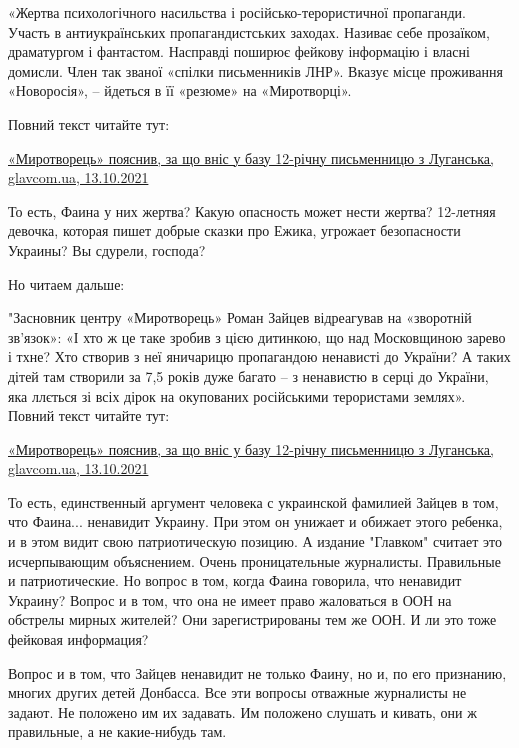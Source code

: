 «Жертва психологічного насильства і російсько-терористичної пропаганди. Участь
в антиукраїнських пропагандистських заходах. Називає себе прозаїком,
драматургом і фантастом. Насправді поширює фейкову інформацію і власні домисли.
Член так званої «спілки письменників ЛНР». Вказує місце проживання «Новоросія»,
– йдеться в її «резюме» на «Миротворці». 

Повний текст читайте тут:

\href{https://glavcom.ua/country/criminal/mirotvorec-poyasniv-za-shcho-vnis-u-bazu-12-richnu-pismennicyu-z-luganska-790774.html}{%
«Миротворець» пояснив, за що вніс у базу 12-річну письменницю з Луганська, glavcom.ua, 13.10.2021%
}

То есть, Фаина у них жертва? Какую опасность может нести жертва? 12-летняя
девочка, которая пишет добрые сказки про Ежика, угрожает безопасности Украины?
Вы сдурели, господа?

Но читаем дальше: 

"Засновник центру «Миротворець» Роман Зайцев відреагував на «зворотній
зв’язок»: «І хто ж це таке зробив з цією дитинкою, що над Московщиною зарево і
тхне? Хто створив з неї яничарицю пропагандою ненависті до України? А таких
дітей там створили за 7,5 років дуже багато – з ненавистю в серці до України,
яка ллється зі всіх дірок на окупованих російськими терористами землях». Повний
текст читайте тут: 

\href{https://glavcom.ua/country/criminal/mirotvorec-poyasniv-za-shcho-vnis-u-bazu-12-richnu-pismennicyu-z-luganska-790774.html}{%
«Миротворець» пояснив, за що вніс у базу 12-річну письменницю з Луганська, glavcom.ua, 13.10.2021%
}

То есть, единственный аргумент человека с украинской фамилией Зайцев в том, что
Фаина... ненавидит Украину. При этом он унижает и обижает этого ребенка, и в
этом видит свою патриотическую позицию. А издание "Главком" считает это
исчерпывающим объяснением. Очень проницательные журналисты. Правильные и
патриотические. Но вопрос в том, когда Фаина говорила, что ненавидит Украину?
Вопрос и в том, что она не имеет право жаловаться в ООН на обстрелы мирных
жителей? Они зарегистрированы тем же ООН. И ли это тоже фейковая информация?

Вопрос и в том, что Зайцев ненавидит не только Фаину, но и, по его признанию,
многих других детей Донбасса. Все эти вопросы отважные журналисты не задают. Не
положено им их задавать. Им положено слушать и кивать, они ж правильные, а не
какие-нибудь там.

